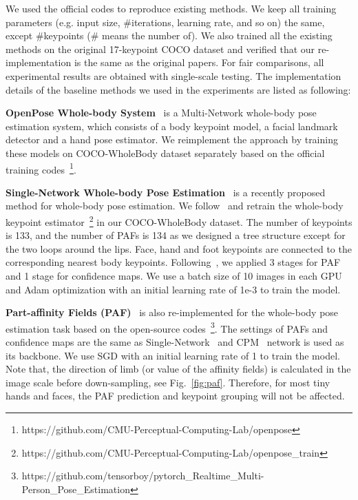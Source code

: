 \documentclass[runningheads]{llncs}
\begin{document}
	We used the official codes to reproduce existing methods. We keep all training parameters (e.g. input size, \#iterations, learning rate, and so on) the same, except \#keypoints (\# means the number of). We also trained all the existing methods on the original 17-keypoint COCO dataset and verified that our re-implementation is the same as the original papers. For fair comparisons, all experimental results are obtained with single-scale testing. The implementation details of the baseline methods we used in the experiments are listed as following:
	
	\textbf{OpenPose Whole-body System}~\cite{cao2018openpose} is a Multi-Network whole-body pose estimation system, which consists of a body keypoint model, a facial landmark detector and a hand pose estimator. We reimplement the approach by training these models on COCO-WholeBody dataset separately based on the official training codes~\footnote{https://github.com/CMU-Perceptual-Computing-Lab/openpose}.
	
	\textbf{Single-Network Whole-body Pose Estimation}~\cite{hidalgo2019single} is a recently proposed method for whole-body pose estimation. We follow~\cite{hidalgo2019single} and retrain the whole-body keypoint estimator~\footnote{https://github.com/CMU-Perceptual-Computing-Lab/openpose\_train} in our COCO-WholeBody dataset. The number of keypoints is 133, and the number of PAFs is 134 as we designed a tree structure except for the two loops around the lips. Face, hand and foot keypoints are connected to the corresponding nearest body keypoints. Following~\cite{hidalgo2019single}, we applied 3 stages for PAF and 1 stage for confidence maps. We use a batch size of 10 images in each GPU and Adam optimization with an initial learning rate of 1e-3 to train the model.
	
	\textbf{Part-affinity Fields (PAF)}~\cite{cao2017realtime} is also re-implemented for the whole-body pose estimation task based on the open-source codes~\footnote{https://github.com/tensorboy/pytorch\_Realtime\_Multi-Person\_Pose\_Estimation}. The settings of PAFs and confidence maps are the same as Single-Network~\cite{hidalgo2019single} and CPM~\cite{wei2016convolutional} network is used as its backbone. We use SGD with an initial learning rate of 1 to train the model. Note that, the direction of limb (or value of the affinity fields) is calculated in the image scale before down-sampling, see Fig.~\ref{fig:paf}. Therefore, for most tiny hands and faces, the PAF prediction and keypoint grouping will not be affected.
	
\end{document}
